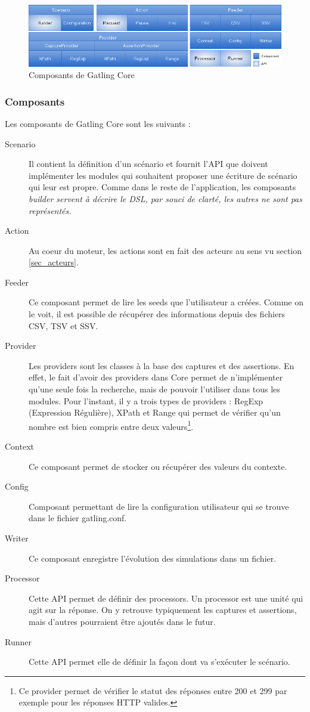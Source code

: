 \begin{figure}[h]
\begin{center}
\includegraphics[width=400pt]{img/gatling_core.png}
\end{center}
\caption{Composants de Gatling Core}
\label{gatling_core}
\end{figure}

\subsubsection{Composants}
\label{sec_core_comp}
Les composants de Gatling Core sont les suivants :
\begin{description}
\item[Scenario] Il contient la définition d'un scénario et fournit l'API que doivent implémenter les modules qui souhaitent proposer une écriture de scénario qui leur est propre. Comme dans le reste de l'application, les composants \em{builder} servent à décrire le DSL, par souci de clarté, les autres ne sont pas représentés.
\item[Action] Au coeur du moteur, les actions sont en fait des acteurs au sens vu section \ref{sec_acteurs}.
\item[Feeder] Ce composant permet de lire les seeds que l'utilisateur a créées. Comme on le voit, il est possible de récupérer des informations depuis des fichiers CSV, TSV et SSV.
\item[Provider] Les providers sont les classes à la base des captures et des assertions. En effet, le fait d'avoir des providers dans Core permet de n'implémenter qu'une seule fois la recherche, mais de pouvoir l'utiliser dans tous les modules. Pour l'instant, il y a trois types de providers : RegExp (Expression Régulière), XPath et Range qui permet de vérifier qu'un nombre est bien compris entre deux valeurs\footnote{Ce provider permet de vérifier le statut des réponses entre 200 et 299 par exemple pour les réponses HTTP valides.}.
\item[Context] Ce composant permet de stocker ou récupérer des valeurs du contexte.
\item[Config] Composant permettant de lire la configuration utilisateur qui se trouve dans le fichier gatling.conf.
\item[Writer] Ce composant enregistre l'évolution des simulations dans un fichier.
\item[Processor] Cette API permet de définir des processors. Un processor est une unité qui agit sur la réponse. On y retrouve typiquement les captures et assertions, mais d'autres pourraient être ajoutés dans le futur.
\item[Runner] Cette API permet elle de définir la façon dont va s'exécuter le scénario.
\end{description}

